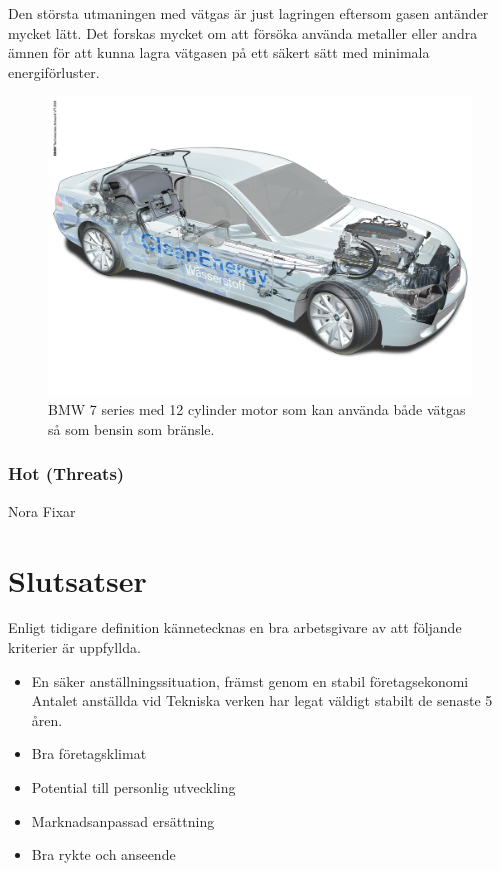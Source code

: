 \documentclass[10pt,a4paper]{article}
\begin{document}
Den största utmaningen med vätgas är just lagringen eftersom gasen antänder mycket lätt. Det forskas mycket om att försöka använda metaller eller andra ämnen för att kunna lagra vätgasen på ett säkert sätt med minimala energiförluster.

\begin{figure}[H] 
\centerline{\includegraphics[scale=0.14]{Bilder/bmwcar.jpg}}
\caption{BMW 7 series med 12 cylinder motor som kan använda både vätgas så som bensin som bränsle.}
\label{fig:bmw}
\end{figure}







\subsubsection{Hot (Threats)}
Nora Fixar


\section{Slutsatser}
Enligt tidigare definition kännetecknas en bra arbetsgivare av att följande kriterier är uppfyllda.

\begin{itemize}
 \item En säker anställningssituation, främst genom en stabil företagsekonomi 
 Antalet anställda vid Tekniska verken har legat väldigt stabilt de senaste 5 åren. 
 \item Bra företagsklimat
 \item Potential till personlig utveckling
 \item Marknadsanpassad ersättning
 \item Bra rykte och anseende
\end{itemize}
\end{document}
